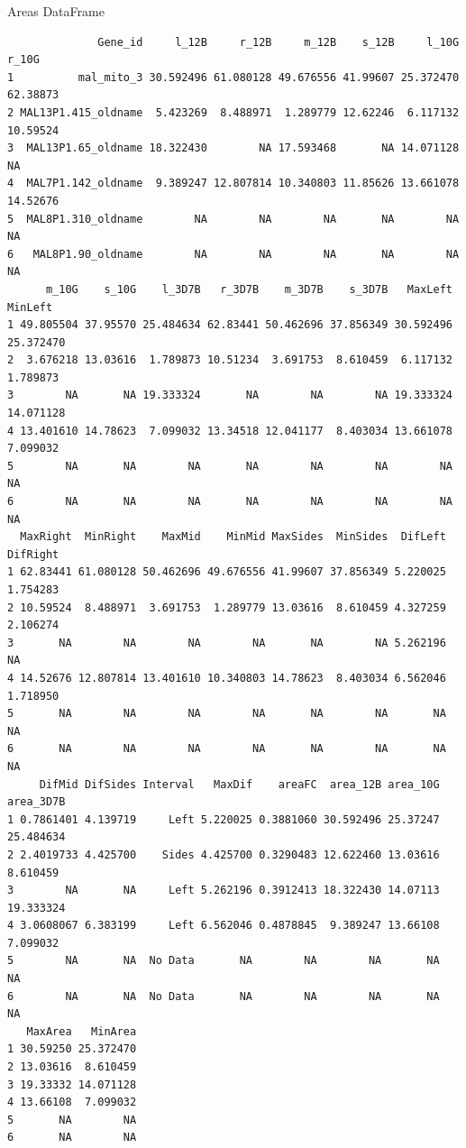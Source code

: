 \documentclass[11pt]{article}
\begin{document}
Areas DataFrame
\begin{verbatim}
              Gene_id     l_12B     r_12B     m_12B    s_12B     l_10G    r_10G
1          mal_mito_3 30.592496 61.080128 49.676556 41.99607 25.372470 62.38873
2 MAL13P1.415_oldname  5.423269  8.488971  1.289779 12.62246  6.117132 10.59524
3  MAL13P1.65_oldname 18.322430        NA 17.593468       NA 14.071128       NA
4  MAL7P1.142_oldname  9.389247 12.807814 10.340803 11.85626 13.661078 14.52676
5  MAL8P1.310_oldname        NA        NA        NA       NA        NA       NA
6   MAL8P1.90_oldname        NA        NA        NA       NA        NA       NA
      m_10G    s_10G    l_3D7B   r_3D7B    m_3D7B    s_3D7B   MaxLeft   MinLeft
1 49.805504 37.95570 25.484634 62.83441 50.462696 37.856349 30.592496 25.372470
2  3.676218 13.03616  1.789873 10.51234  3.691753  8.610459  6.117132  1.789873
3        NA       NA 19.333324       NA        NA        NA 19.333324 14.071128
4 13.401610 14.78623  7.099032 13.34518 12.041177  8.403034 13.661078  7.099032
5        NA       NA        NA       NA        NA        NA        NA        NA
6        NA       NA        NA       NA        NA        NA        NA        NA
  MaxRight  MinRight    MaxMid    MinMid MaxSides  MinSides  DifLeft DifRight
1 62.83441 61.080128 50.462696 49.676556 41.99607 37.856349 5.220025 1.754283
2 10.59524  8.488971  3.691753  1.289779 13.03616  8.610459 4.327259 2.106274
3       NA        NA        NA        NA       NA        NA 5.262196       NA
4 14.52676 12.807814 13.401610 10.340803 14.78623  8.403034 6.562046 1.718950
5       NA        NA        NA        NA       NA        NA       NA       NA
6       NA        NA        NA        NA       NA        NA       NA       NA
     DifMid DifSides Interval   MaxDif    areaFC  area_12B area_10G area_3D7B
1 0.7861401 4.139719     Left 5.220025 0.3881060 30.592496 25.37247 25.484634
2 2.4019733 4.425700    Sides 4.425700 0.3290483 12.622460 13.03616  8.610459
3        NA       NA     Left 5.262196 0.3912413 18.322430 14.07113 19.333324
4 3.0608067 6.383199     Left 6.562046 0.4878845  9.389247 13.66108  7.099032
5        NA       NA  No Data       NA        NA        NA       NA        NA
6        NA       NA  No Data       NA        NA        NA       NA        NA
   MaxArea   MinArea
1 30.59250 25.372470
2 13.03616  8.610459
3 19.33332 14.071128
4 13.66108  7.099032
5       NA        NA
6       NA        NA
\end{verbatim}
\end{document}
